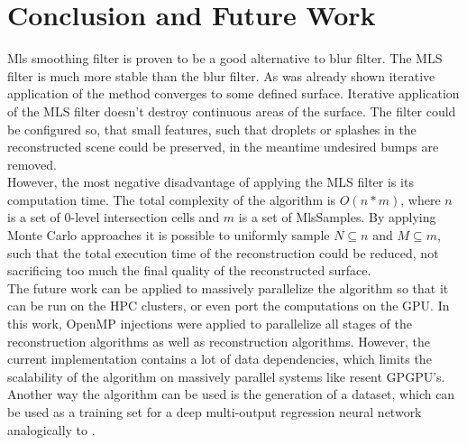 \section{Conclusion and Future Work}
Mls smoothing filter is proven to be a good alternative to blur filter. The MLS filter is much more stable than the blur filter. As was already shown iterative application of the method converges to some defined surface. Iterative application of the MLS filter doesn't destroy continuous areas of the surface. The filter could be configured so, that small features, such that droplets or splashes in the reconstructed scene could be preserved, in the meantime undesired bumps are removed.\\
However, the most negative disadvantage of applying the MLS filter is its computation time. The total complexity of the algorithm is $O(n*m)$, where $n$ is a set of 0-level intersection cells and $m$ is a set of MlsSamples. By applying Monte Carlo approaches it is possible to uniformly sample $N \subseteq n$ and $M \subseteq m$, such that the total execution time of the reconstruction could be reduced, not sacrificing too much the final quality of the reconstructed surface.\\
The future work can be applied to massively parallelize the algorithm so that it can be run on the HPC clusters, or even port the computations on the GPU. In this work, OpenMP injections were applied to parallelize all stages of the reconstruction algorithms as well as reconstruction algorithms. However, the current implementation contains a lot of data dependencies, which limits the scalability of the algorithm on massively parallel systems like resent GPGPU's.\\ Another way the algorithm can be used is the generation of a dataset, which can be used as a training set for a deep multi-output regression neural network analogically to \cite{DNNNoiseFilter}.